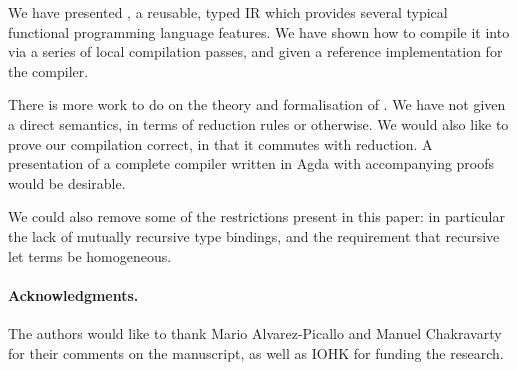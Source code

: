 We have presented \FIR{}, a reusable, typed IR which provides several typical
functional programming language features. We have shown how to compile it into
\FOMF{} via a series of local compilation passes, and given a reference
implementation for the compiler.

There is more work to do on the theory and formalisation of \FIR{}. We
have not given a direct semantics, in terms of reduction rules or otherwise.
We would also like to prove our compilation correct, in that it commutes with
reduction. A presentation of a complete compiler written in Agda with
accompanying proofs would be desirable.

We could also remove some of the restrictions present in this paper: in
particular the lack of mutually recursive type bindings, and the
requirement that recursive let terms be homogeneous.

\paragraph{Acknowledgments.}
The authors would like to thank Mario Alvarez-Picallo and Manuel Chakravarty
for their comments on the manuscript, as well as IOHK for funding the research.





